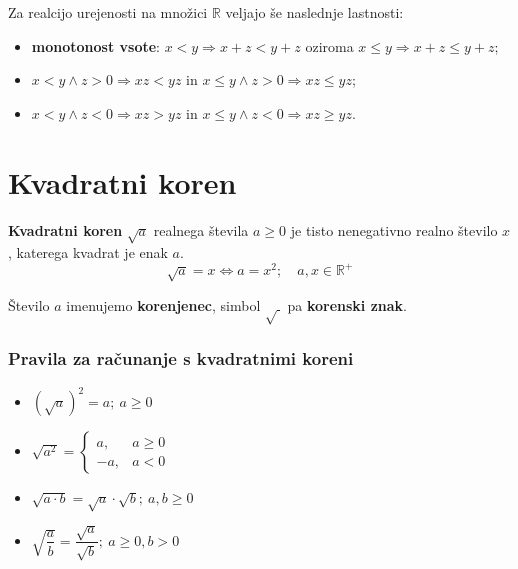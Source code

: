            
                Za realcijo urejenosti na množici $\mathbb{R}$ veljajo še naslednje lastnosti:

                \begin{itemize}
                    \item \textbf{monotonost vsote}: $x<y \Rightarrow x+z<y+z$ oziroma $x\leq y \Rightarrow x+z\leq y+z$;
                    \item $x<y \land z>0 \Rightarrow xz<yz$ in $x\leq y \land z>0 \Rightarrow x z\leq y z$;
                    \item $x<y \land z<0 \Rightarrow xz>yz$ in $x\leq y \land z<0 \Rightarrow x z\geq y z$.
                \end{itemize}

            

        
\newpage


    \section{Kvadratni koren}

            
                \textbf{Kvadratni koren} $\sqrt{a}$ realnega števila $a\geq 0$ je tisto nenegativno realno število $x$,
                katerega kvadrat je enak $a$.
                $$\sqrt{a}=x \Leftrightarrow a=x^2; \quad a,x\in\mathbb{R}^+ $$

                Število $a$ imenujemo \textbf{korenjenec}, simbol $\sqrt{~}$ pa \textbf{korenski znak}.
            

            \subsubsection*{Pravila za računanje s kvadratnimi koreni}
                    
                        \begin{itemize}
                            \item $\left(\sqrt{a}\right)^2=a; ~a\geq 0$
                            \item $\sqrt{a^2}=\begin{cases}
                                a, & a\geq 0 \\
                                -a, & a<0
                            \end{cases}$
                            \item $\sqrt{a\cdot b}=\sqrt{a}\cdot\sqrt{b}; ~a,b\geq 0$
                            \item $\sqrt{\dfrac{a}{b}}=\dfrac{\sqrt{a}}{\sqrt{b}}; ~a\geq 0, b>0$
                        \end{itemize}
                    
